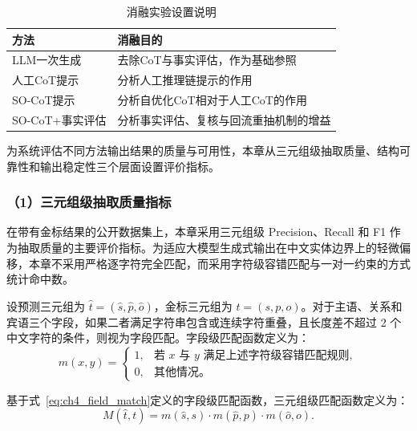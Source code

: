 \begin{table}[htbp]
  \centering
  \caption{消融实验设置说明}
  \label{tab:ablation_methods}
  {
  \small
  \setlength{\tabcolsep}{4pt}
  \begin{tabularx}{0.96\textwidth}{
    >{\raggedright\arraybackslash}p{}
    >{\raggedright\arraybackslash}X
  }
    \toprule
    方法 & 消融目的 \\
    \midrule
    LLM一次生成
    & 去除CoT与事实评估，作为基础参照 \\

    人工CoT提示
    & 分析人工推理链提示的作用 \\

    SO-CoT提示
    & 分析自优化CoT相对于人工CoT的作用 \\

    SO-CoT+事实评估
    & 分析事实评估、复核与回流重抽机制的增益 \\
    \bottomrule
  \end{tabularx}}
\end{table}

为系统评估不同方法输出结果的质量与可用性，本章从三元组级抽取质量、结构可靠性和输出稳定性三个层面设置评价指标。

\subsubsection*{（1）三元组级抽取质量指标}

  在带有金标结果的公开数据集上，本章采用三元组级 Precision、Recall 和 F1 作为抽取质量的主要评价指标。为适应大模型生成式输出在中文实体边界上的轻微偏移，本章不采用严格逐字符完全匹配，而采用字符级容错匹配与一对一约束的方式统计命中数。

  设预测三元组为 $\hat{t}=(\hat{s},\hat{p},\hat{o})$，金标三元组为 $t=(s,p,o)$。对于主语、关系和宾语三个字段，如果二者满足字符串包含或连续字符重叠，且长度差不超过 2 个中文字符的条件，则视为字段匹配。字段级匹配函数定义为：
  \begin{equation}
  m(x,y)=
  \begin{cases}
  1, & \text{若 } x \text{ 与 } y \text{ 满足上述字符级容错匹配规则}, \\
  0, & \text{其他情况。}
  \end{cases}
  \label{eq:ch4_field_match}
  \end{equation}

  基于式~\eqref{eq:ch4_field_match}定义的字段级匹配函数，三元组级匹配函数定义为：
  \begin{equation}
  M(\hat{t},t)=m(\hat{s},s)\cdot m(\hat{p},p)\cdot m(\hat{o},o).
  \label{eq:ch4_triple_match}
  \end{equation}

